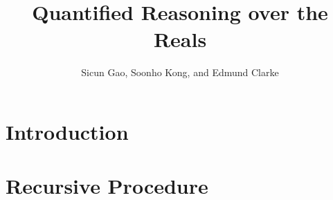 \documentclass{article}
\title{Quantified Reasoning over the Reals}
\author{Sicun Gao, Soonho Kong, and Edmund Clarke}
\begin{document}
\maketitle


\begin{abstract}

\end{abstract}


\section{Introduction}

\section{Recursive Procedure}

\section{}
\end{document}
